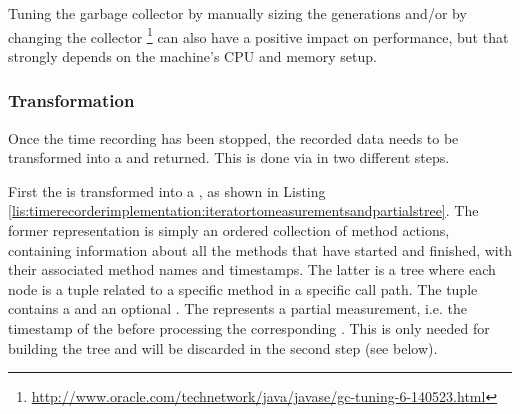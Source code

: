 \noindent Tuning the garbage collector by manually sizing the generations and/or by changing the collector \footnote{\url{http://www.oracle.com/technetwork/java/javase/gc-tuning-6-140523.html}} can also have a positive impact on performance, but that strongly depends on the machine's CPU and memory setup.

\subsubsection{Transformation}
Once the time recording has been stopped, the recorded data needs to be transformed into a  and returned. This is done via  in two different steps.

\noindent First the  is transformed into a , as shown in Listing \ref{lis:timerecorderimplementation:iteratortomeasurementsandpartialstree}. The former representation is simply an ordered collection of method actions, containing information about all the methods that have started and finished, with their associated method names and timestamps. The latter is a tree where each node is a tuple related to a specific method in a specific call path. The tuple contains a  and an optional . The  represents a partial measurement, i.e. the timestamp of the  before processing the corresponding . This is only needed for building the tree and will be discarded in the second step (see below).

